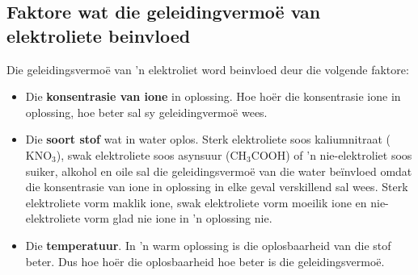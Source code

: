             \subsection*{Faktore wat die geleidingvermoë van elektroliete beinvloed}
            \nopagebreak
Die geleidingsvermoë van 'n elektroliet word beinvloed deur die volgende faktore:
        \label{m38720*id339291}\begin{itemize}[noitemsep]
\label{m38720*uid58}\item Die \textbf{konsentrasie van ione} in oplossing. Hoe ho\"{e}r die konsentrasie ione in oplossing, hoe beter sal sy geleidingvermo\"{e} wees.
\label{m38720*uid57}\item Die \textbf{soort stof} wat in water oplos. Sterk elektroliete soos kaliumnitraat (${\text{KNO}}_{3}$), swak elektroliete soos asynsuur (${\text{CH}}_{3}\text{COOH}$) of 'n nie-elektroliet soos suiker, alkohol en oile sal die geleidingsvermoë van die water beïnvloed omdat die konsentrasie van ione in oplossing in elke geval verskillend sal wees. Sterk elektroliete vorm maklik ione, swak elektroliete vorm moeilik ione en nie-elektroliete vorm glad nie ione in 'n oplossing nie.
\label{m38720*uid59}\item Die \textbf{temperatuur}. In 'n warm oplossing is die oplosbaarheid van die stof beter.  Dus hoe ho\"{e}r die oplosbaarheid hoe beter is die geleidingsvermo\"{e}.
\end{itemize} \nopagebreak
\label{m38720*secfhsst!!!underscore!!!id739}
